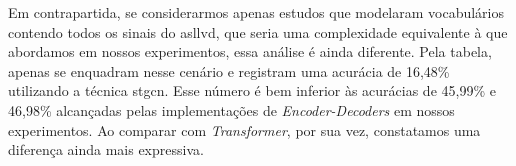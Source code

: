 
Em contrapartida, se considerarmos apenas estudos que modelaram vocabulários contendo todos os sinais do \acrshort{asllvd}, que seria uma complexidade equivalente à que abordamos em nossos experimentos, essa análise é ainda diferente.
Pela tabela, apenas  se enquadram nesse cenário e registram uma acurácia de 16,48\% utilizando a técnica \acrshort{stgcn}.
Esse número é bem inferior às acurácias de 45,99\% e 46,98\% alcançadas pelas implementações de \textit{Encoder-Decoders} em nossos experimentos. Ao comparar com \textit{Transformer}, por sua vez, constatamos uma diferença ainda mais expressiva.










